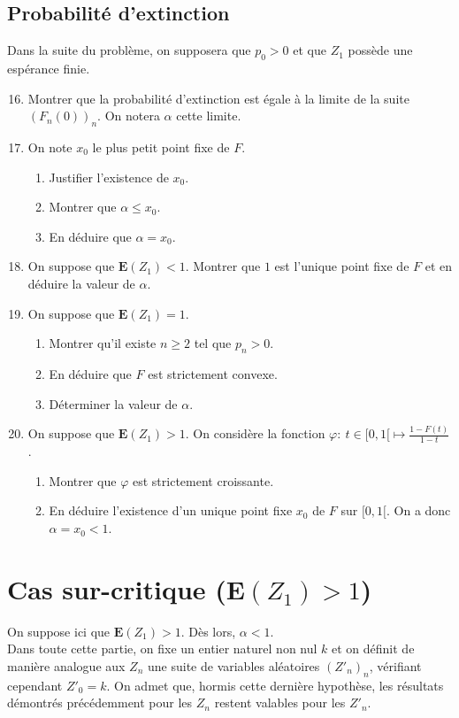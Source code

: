 \documentclass[a4paper,11pt]{article}
\newcommand{\E}{\mathbf{E}}
\newcommand{\suite}[2]{{\left({#1}_{#2}\right)}_{#2}}
\begin{document}
\subsection{Probabilité d'extinction}
Dans la suite du problème, on supposera que $p_0>0$ et que $Z_1$ possède une espérance finie.
\begin{enumerate}
\setcounter{enumi}{15}
\item Montrer que la probabilité d'extinction est égale à la limite de la suite ${\left( F_n(0)\right)}_n$. On notera $\alpha$ cette limite.
\item On note $x_0$ le plus petit point fixe de $F$.
\begin{enumerate}
\item Justifier l'existence de $x_0$.
\item Montrer que $\alpha\leq x_0$.
\item En déduire que $\alpha=x_0$.
\end{enumerate}
\item On suppose que $\E(Z_1)< 1$. Montrer que $1$ est l'unique point fixe de $F$ et en déduire la valeur de $\alpha$.
\item On suppose que $\E(Z_1)= 1$.
\begin{enumerate}
\item Montrer qu'il existe $n\geq 2$ tel que $p_n>0$.
\item En déduire que $F$ est strictement convexe.
\item Déterminer la valeur de $\alpha$.
\end{enumerate}
\item On suppose que $\E(Z_1)> 1$. On considère la fonction $\varphi:\ t\in[0,1[\mapsto\frac{1-F(t)}{1-t}$.
\begin{enumerate}
\item Montrer que $\varphi$ est strictement croissante.
\item En déduire l'existence d'un unique point fixe $x_0$ de $F$ sur $[0,1[$. On a donc $\alpha=x_0<1$.
\end{enumerate}
\end{enumerate}

\section{Cas sur-critique ($\E(Z_1)>1$)}
On suppose ici que $\E(Z_1)>1$. Dès lors, $\alpha<1$.\\

Dans toute cette partie, on fixe un entier naturel non nul $k$ et on définit de manière analogue aux $Z_n$ une suite de variables aléatoires $\suite{Z'}{n}$, vérifiant cependant ${Z'}_0=k$. On admet que, hormis cette dernière hypothèse, les résultats démontrés précédemment pour les $Z_n$ restent valables pour les ${Z'}_n$.\\
\end{document}
